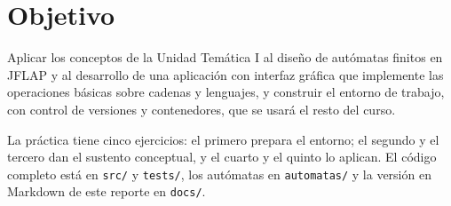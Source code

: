 \documentclass[12pt]{article}
\begin{document}


\tableofcontents
\clearpage

\section{Objetivo}
Aplicar los conceptos de la Unidad Temática I al diseño de autómatas finitos en JFLAP y al desarrollo de una aplicación con interfaz gráfica que implemente las operaciones básicas sobre cadenas y lenguajes, y construir el entorno de trabajo, con control de versiones y contenedores, que se usará el resto del curso.

La práctica tiene cinco ejercicios: el primero prepara el entorno; el segundo y el tercero dan el sustento conceptual, y el cuarto y el quinto lo aplican. El código completo está en \texttt{src/} y \texttt{tests/}, los autómatas en \texttt{automatas/} y la versión en Markdown de este reporte en \texttt{docs/}.








\clearpage
\printbibliography[title={Referencias}]

\clearpage
\appendix
{}
\renewcommand{\thesection}{\Alph{section}}
\begingroup
\singlespacing\small
\setlength{\LTpre}{0.3em}\setlength{\LTpost}{0.3em}

\endgroup
\end{document}
